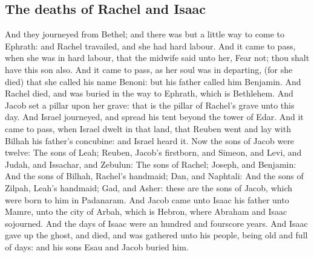 \begin{biblechapter}
\section*{The deaths of Rachel and Isaac}
\verse And they journeyed from Bethel; and there was but a little way to come to Ephrath: and Rachel travailed, and she had hard labour.
\verse And it came to pass, when she was in hard labour, that the midwife said unto her, Fear not; thou shalt have this son also.
\verse And it came to pass, as her soul was in departing, (for she died) that she called his name Benoni: but his father called him Benjamin.
\verse And Rachel died, and was buried in the way to Ephrath, which is Bethlehem.
\verse And Jacob set a pillar upon her grave: that is the pillar of Rachel's grave unto this day.
\verse And Israel journeyed, and spread his tent beyond the tower of Edar.
\verse And it came to pass, when Israel dwelt in that land, that Reuben went and lay with Bilhah his father's concubine: and Israel heard it. Now the sons of Jacob were twelve:
\verse The sons of Leah; Reuben, Jacob's firstborn, and Simeon, and Levi, and Judah, and Issachar, and Zebulun:
\verse The sons of Rachel; Joseph, and Benjamin:
\verse And the sons of Bilhah, Rachel's handmaid; Dan, and Naphtali:
\verse And the sons of Zilpah, Leah's handmaid; Gad, and Asher: these are the sons of Jacob, which were born to him in Padanaram.
\verse And Jacob came unto Isaac his father unto Mamre, unto the city of Arbah, which is Hebron, where Abraham and Isaac sojourned.
\verse And the days of Isaac were an hundred and fourscore years.
\verse And Isaac gave up the ghost, and died, and was gathered unto his people, being old and full of days: and his sons Esau and Jacob buried him.
\end{biblechapter}

